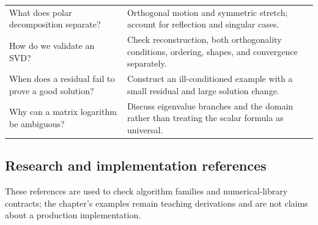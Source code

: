 {\begin{longtable}[]{@{}
  >{\raggedright\arraybackslash}p{}
  >{\raggedright\arraybackslash}p{}@{}}
What does polar decomposition separate? & Orthogonal motion and symmetric stretch; account for reflection and singular cases. \\
How do we validate an SVD? & Check reconstruction, both orthogonality conditions, ordering, shapes, and convergence separately. \\
When does a residual fail to prove a good solution? & Construct an ill-conditioned example with a small residual and large solution change. \\
Why can a matrix logarithm be ambiguous? & Discuss eigenvalue branches and the domain rather than treating the scalar formula as universal. \\
\end{longtable}
}

\subsection{Research and implementation references}\label{02-foundations-ii-ch039-research-and-implementation-references}

These references are used to check algorithm families and numerical-library contracts; the chapter's examples remain teaching derivations and are not claims about a production implementation.

